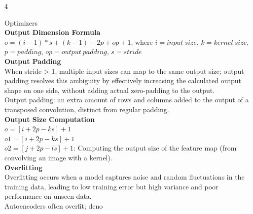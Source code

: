 \documentclass[8pt]{extarticle}
\begin{document}
\begin{multicols}{4}
{Optimizers\\
\vspace{2pt}\textbf{Output Dimension Formula}\\
$o = (i - 1) * s + (k - 1) - 2p + op + 1$, where $i = input\ size$, $k = kernel\ size$, $p = padding$, $op = output\ padding$, $s = stride$\\
\vspace{2pt}\textbf{Output Padding}\\
When stride > 1, multiple input sizes can map to the same output size; output padding resolves this ambiguity by effectively increasing the calculated output shape on one side, without adding actual zero-padding to the output.\\
Output padding: an extra amount of rows and columns added to the output of a transposed convolution, distinct from regular padding.\\
\vspace{2pt}\textbf{Output Size Computation}\\
$o = [i + 2p - k s] + 1$\\
$o1 = [i + 2p - k s] + 1$\\
$o2 = [j + 2p - l s] + 1$\Theorem: Computing the output size of the feature map (from convolving an image with a kernel).\\
\vspace{2pt}\textbf{Overfitting}\\
Overfitting occurs when a model captures noise and random fluctuations in the training data, leading to low training error but high variance and poor performance on unseen data.\\
Autoencoders often overfit; deno

}
\end{multicols}
\end{document}
